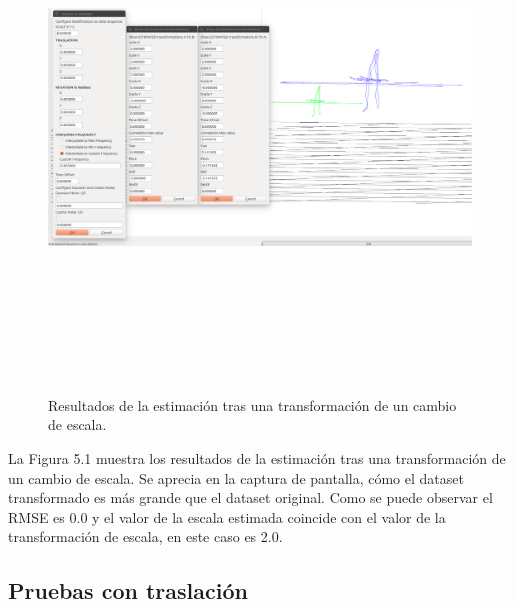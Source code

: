 \begin{figure}[H]
\label{fig:escalaTest}\includegraphics[height=14.0cm,width=18.0cm]{img/cap6/Escala_abba.png}
\hspace{0.5cm}


\caption{Resultados de la estimación tras una transformación de un cambio de escala.}
\end{figure}

La Figura 5.1 muestra los resultados de la estimación tras una transformación de un cambio de escala. Se aprecia en la captura de pantalla, cómo el dataset transformado es más grande que el dataset original. Como se puede observar el RMSE es 0.0 y el valor de la escala estimada coincide con el valor de la transformación de escala, en este caso es 2.0.

\subsection{Pruebas con traslación}

